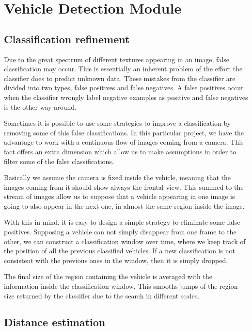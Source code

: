 \chapter{Vehicle Detection Module}  \label{kap:vehicle-detection}

\section{Classification refinement} %
\label{sec:Classification-refinement}

Due to the great spectrum of different textures appearing in an image, false
classification may occur. This is essentially an inherent problem of the
effort the classifier does to predict unknown data. These mistakes from the
classifier are divided into two types, false positives and false negatives. A
false positives occur when the classifier wrongly label negative examples as 
positive and false negatives is the other way around.

Sometimes it is possible to use some strategies to improve a classification by
removing some of this false classifications. In this particular project, we have
the advantage to work with a continuous flow of images coming from a camera.
This fact offers an extra dimension which allow us to make assumptions in
order to filter some of the false classifications.

Basically we assume the camera is fixed inside the vehicle, meaning that the images
coming from it should show always the frontal view. This summed to the stream of
images allow us to suppose that a vehicle appearing in one image is going to also 
appear in the next one, in almost the same region inside the image.

With this in mind, it is easy to design a simple strategy to eliminate some
false positives. Supposing a vehicle can not simply disappear from one
frame to the other, we can construct a classification window over time, where we
keep track of the position of all the previous classified vehicles. If a new
classification is not consistent with the previous ones in the window, then it
is simply dropped. 

The final size of the region containing the vehicle is averaged with the
information inside the classification window. This smooths jumps of the region
size returned by the classifier due to the search in different scales.



\section{Distance estimation} %
\label{sec:Distance-estimation}


